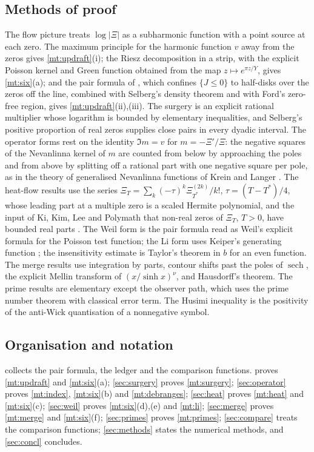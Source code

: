 \documentclass[11pt]{article}
\theoremstyle{definition}\newtheorem{definition}[theorem]{Definition}
\theoremstyle{remark}\newtheorem{remark}[theorem]{Remark}
\begin{document}
\subsection{Methods of proof}
The flow picture treats $\log|\Xi|$ as a subharmonic function with a point source at each zero. The maximum principle for the harmonic function $v$ away from the zeros gives \cref{mt:updraft}(i); the Riesz decomposition in a strip, with the explicit Poisson kernel and Green function obtained from the map $z\mapsto e^{\pi z/Y}$, gives \cref{mt:six}(a); and the pair formula of \cite{S01}, which confines $\{J\le0\}$ to half-disks over the zeros off the line, combined with Selberg's density theorem and with Ford's zero-free region, gives \cref{mt:updraft}(ii),(iii). The surgery is an explicit rational multiplier whose logarithm is bounded by elementary inequalities, and Selberg's positive proportion of real zeros supplies close pairs in every dyadic interval. The operator forms rest on the identity $\Im m=v$ for $m=-\Xi'/\Xi$: the negative squares of the Nevanlinna kernel of $m$ are counted from below by approaching the poles and from above by splitting off a rational part with one negative square per pole, as in the theory of generalised Nevanlinna functions of Krein and Langer \cite{KL}. The heat-flow results use the series $\Xi_T=\sum_k(-\tau)^k\Xi_{T^*}^{(2k)}/k!$, $\tau=(T-T^*)/4$, whose leading part at a multiple zero is a scaled Hermite polynomial, and the input of Ki, Kim, Lee and Polymath that non-real zeros of $\Xi_T$, $T>0$, have bounded real parts \cite{KKL,Polymath}. The Weil form is the pair formula read as Weil's explicit formula for the Poisson test function; the Li form uses Keiper's generating function \cite{Keiper,BL}; the insensitivity estimate is Taylor's theorem in $b$ for an even function. The merge results use integration by parts, contour shifts past the poles of $\operatorname{sech}$, the explicit Mellin transform of $(x/\sinh x)^\nu$, and Hausdorff's theorem. The prime results are elementary except the observer path, which uses the prime number theorem with classical error term. The Husimi inequality is the positivity of the anti-Wick quantisation of a nonnegative symbol.

\subsection{Organisation and notation}
 collects the pair formula, the ledger and the comparison functions.  proves \cref{mt:updraft} and \cref{mt:six}(a); \cref{sec:surgery} proves \cref{mt:surgery}; \cref{sec:operator} proves \cref{mt:index}, \cref{mt:six}(b) and \cref{mt:debranges}; \cref{sec:heat} proves \cref{mt:heat} and \cref{mt:six}(c); \cref{sec:weil} proves \cref{mt:six}(d),(e) and \cref{mt:li}; \cref{sec:merge} proves \cref{mt:merge} and \cref{mt:six}(f); \cref{sec:primes} proves \cref{mt:primes}; \cref{sec:compare} treats the comparison functions; \cref{sec:methods} states the numerical methods, and \cref{sec:concl} concludes.
\end{document}
